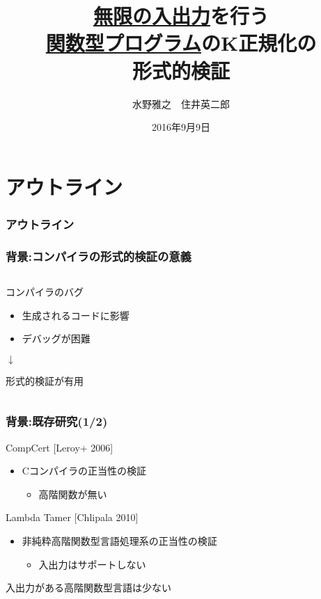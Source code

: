 \documentclass[dvipdfmx,cjk,xcolor=dvipsnames,envcountsect,notheorems,12pt]{beamer}
\title{\underline{無限の入出力}を行う\\ \underline{関数型プログラム}のK正規化の\\形式的検証}
\author{水野雅之　住井英二郎}
\institute[東北大学　住井・松田研]{東北大学 大学院情報科学研究科}%
\date{2016年9月9日}
\theoremstyle{definition}
\begin{document}
\frame[plain]{\titlepage}%

\section*{アウトライン}

\begin{frame}
  \frametitle{アウトライン}
  \tableofcontents[sectionstyle=show,subsectionstyle=hide]
\end{frame}

\begin{frame}
	\frametitle{背景:コンパイラの形式的検証の意義}
	\begin{columns}
		\begin{column}{0.6\textwidth}
			\LARGE コンパイラのバグ
			\begin{itemize}
				\item 生成されるコードに影響
				\item デバッグが困難
			\end{itemize}

			\vfill

			\begin{center}
				$\downarrow$
			\end{center}

			\vfill

			形式的検証が有用
		\end{column}
	\end{columns}
\end{frame}

\begin{frame}
	\frametitle{背景:既存研究(1/2)}
	\LARGE CompCert [Leroy+ 2006]
	\begin{itemize}
		\item Cコンパイラの正当性の検証
			\begin{itemize}
				\item 高階関数が無い
			\end{itemize}
	\end{itemize}

	Lambda Tamer [Chlipala 2010]
	\begin{itemize}
		\item 非純粋高階関数型言語処理系の正当性の検証
			\begin{itemize}
				\item 入出力はサポートしない
			\end{itemize}
	\end{itemize}

	\vfill

	入出力がある高階関数型言語は少ない
\end{frame}
\end{document}
